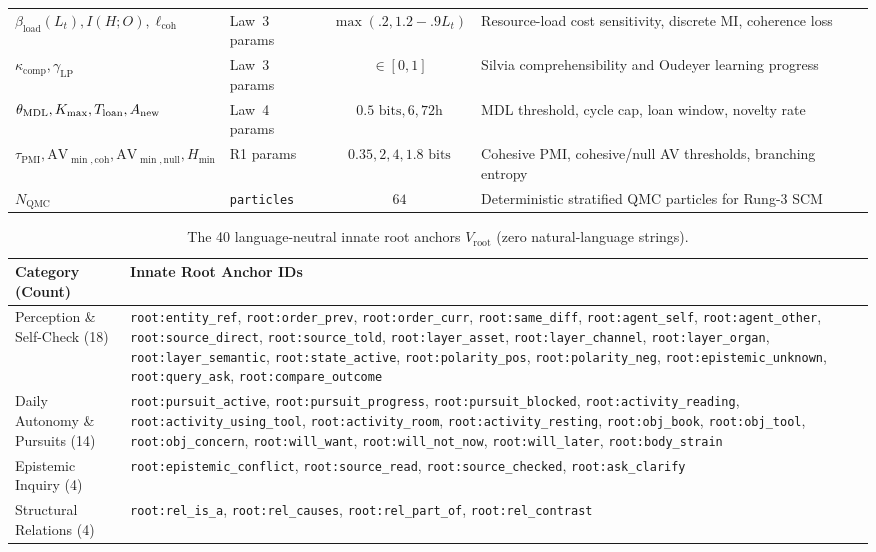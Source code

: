 \begin{table}[htbp]
{{\begin{tabular}{llcl}
    $\beta_{\mathrm{load}}(L_t), I(H;O), \ell_{\mathrm{coh}}$ & Law~3 params & $\max(.2, 1.2-.9 L_t)$ & Resource-load cost sensitivity, discrete MI, coherence loss \\
    $\kappa_{\mathrm{comp}}, \gamma_{\mathrm{LP}}$ & Law~3 params & $\in [0, 1]$ & Silvia comprehensibility and Oudeyer learning progress \\
    $\theta_{\mathrm{MDL}}, K_{\max}, T_{\mathrm{loan}}, A_{\mathrm{new}}$ & Law~4 params & $0.5\text{ bits}, 6, 72\text{h}$ & MDL threshold, cycle cap, loan window, novelty rate \\
    $\tau_{\mathrm{PMI}}, \mathrm{AV}_{\min,\mathrm{coh}}, \mathrm{AV}_{\min,\mathrm{null}}, H_{\min}$ & R1 params & $0.35, 2, 4, 1.8\text{ bits}$ & Cohesive PMI, cohesive/null AV thresholds, branching entropy \\
    $N_{\mathrm{QMC}}$ & \texttt{particles} & $64$ & Deterministic stratified QMC particles for Rung-3 SCM \\
    \bottomrule
  \end{tabular}}%
  }
\end{table}

\begin{table}[htbp]
  \centering
  \caption{The 40 language-neutral innate root anchors $V_{\mathrm{root}}$ (zero natural-language strings).}
  \label{tab:roots40}
  {\footnotesize
  \begin{tabularx}{\textwidth}{l>{\raggedright\arraybackslash}X}
    \toprule
    Category (Count) & Innate Root Anchor IDs \\
    \midrule
    Perception \& Self-Check (18) & \texttt{root:entity\_ref}, \texttt{root:order\_prev}, \texttt{root:order\_curr}, \texttt{root:same\_diff}, \texttt{root:agent\_self}, \texttt{root:agent\_other}, \texttt{root:source\_direct}, \texttt{root:source\_told}, \texttt{root:layer\_asset}, \texttt{root:layer\_channel}, \texttt{root:layer\_organ}, \texttt{root:layer\_semantic}, \texttt{root:state\_active}, \texttt{root:polarity\_pos}, \texttt{root:polarity\_neg}, \texttt{root:epistemic\_unknown}, \texttt{root:query\_ask}, \texttt{root:compare\_outcome} \\
    Daily Autonomy \& Pursuits (14) & \texttt{root:pursuit\_active}, \texttt{root:pursuit\_progress}, \texttt{root:pursuit\_blocked}, \texttt{root:activity\_reading}, \texttt{root:activity\_using\_tool}, \texttt{root:activity\_room}, \texttt{root:activity\_resting}, \texttt{root:obj\_book}, \texttt{root:obj\_tool}, \texttt{root:obj\_concern}, \texttt{root:will\_want}, \texttt{root:will\_not\_now}, \texttt{root:will\_later}, \texttt{root:body\_strain} \\
    Epistemic Inquiry (4) & \texttt{root:epistemic\_conflict}, \texttt{root:source\_read}, \texttt{root:source\_checked}, \texttt{root:ask\_clarify} \\
    Structural Relations (4) & \texttt{root:rel\_is\_a}, \texttt{root:rel\_causes}, \texttt{root:rel\_part\_of}, \texttt{root:rel\_contrast} \\
    \bottomrule
  \end{tabularx}}
\end{table}

